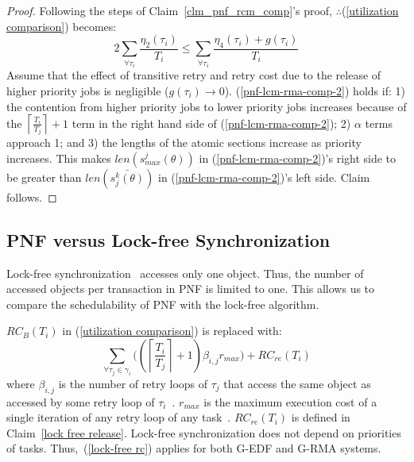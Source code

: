 \documentclass[12pt,english]{report}
\newtheorem{proof}{Proof}
\begin{document}
\begin{proof}
Following the steps of Claim~\ref{clm_pnf_rcm_comp}'s proof, 
$\therefore$(\ref{utilization comparison}) becomes:
\begin{equation}
2\sum_{\forall\tau_{i}}\frac{\eta_{2}(\tau_{i})}{T_{i}}\le\sum_{\forall\tau_{i}}\frac{\eta_{4}(\tau_{i})+g(\tau_{i})}{T_{i}}\label{pnf-lcm-rma-comp-2}
\end{equation}
Assume that the effect of transitive retry and retry cost due
to the release of higher priority jobs is negligible ($g(\tau_{i})\rightarrow0$). (\ref{pnf-lcm-rma-comp-2})
holds if: 1) the contention from higher priority jobs to lower priority
jobs increases because of the $\left\lceil \frac{T_{i}}{T_{j}}\right\rceil +1$
term in the right hand side of (\ref{pnf-lcm-rma-comp-2}); 2) $\alpha$ terms
approach 1; and 3) the lengths of the atomic sections increase as priority
increases. 
%
This makes $len(s_{max}^{j}(\theta))$ in (\ref{pnf-lcm-rma-comp-2})'s right 
side to be greater than $len(\bar{s_{j}^{k}(\theta)})$ in (\ref{pnf-lcm-rma-comp-2})'s left  side.
Claim follows.
\end{proof}

\subsection{PNF versus Lock-free Synchronization\label{pnf vs lock free sec}}

Lock-free synchronization~\cite{key-5,stmconcurrencycontrol:emsoft11} accesses only one object. Thus, the number of accessed objects per transaction in PNF is limited to one. This allows us to compare the schedulability of PNF with the lock-free algorithm. 

$RC_{B}(T_{i})$ in (\ref{utilization comparison}) is replaced with:
%
\begin{equation}
\sum_{\forall\tau_{j}\in\gamma_{i}}\Bigg(\left(\left\lceil \frac{T_{i}}{T_{j}}\right\rceil +1\right)\beta_{i,j}r_{max}\Bigg)+RC_{re}(T_{i})
\label{lock-free rc}
\end{equation}
%
where $\beta_{i,j}$ is the number of retry loops of $\tau_{j}$ that access the same object as accessed by some retry loop of $\tau_{i}$~\cite{key-5}. $r_{max}$ is the maximum execution cost of a single iteration of any retry loop of any task~\cite{key-5}. $RC_{re}(T_i)$ is defined in Claim~\ref{lock free release}. Lock-free synchronization does not depend on priorities  of tasks. Thus,~(\ref{lock-free rc}) applies for both G-EDF and G-RMA systems.
\end{document}
